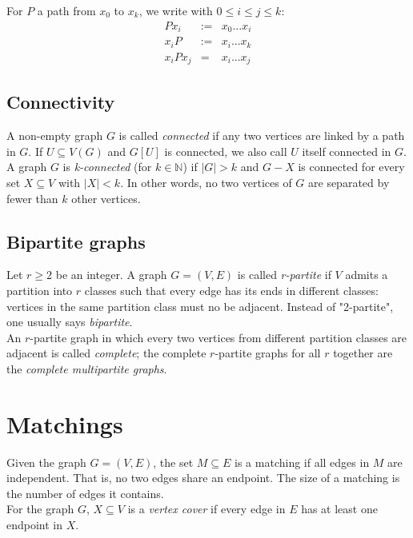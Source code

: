 \documentclass[11pt]{book}
\begin{document}
		For $P$ a path from $x_0$ to $x_k$, we write with $0 \leq i \leq j \leq k$:
		\begin{eqnarray*}
			Px_i &:=& x_0 ... x_i\\
			x_iP &:=& x_i ... x_k\\
			x_iPx_j &=& x_i ... x_j
		\end{eqnarray*}
	
	\section{Connectivity}
		A non-empty graph $G$ is called \textit{connected} if any two vertices are linked by a path in $G$. If $U \subseteq V(G)$ and $G[U]$ is connected, we also call $U$ itself connected in $G$.\\
		
		A graph $G$ is \textit{k-connected} (for $k \in \mathbb{N}$) if $|G| > k$ and $G - X$ is connected for every set $X \subseteq V$ with $|X| < k$. In other words, no two vertices of $G$ are separated by fewer than $k$ other vertices.
		
	\section{Bipartite graphs}
		Let $r \geq 2$ be an integer. A graph $G = (V, E)$ is called \textit{r-partite} if $V$ admits a partition into $r$ classes such that every edge has its ends in different classes: vertices in the same partition class must no be adjacent. Instead of "2-partite", one usually says \textit{bipartite}.\\
		
		An $r$-partite graph in which every two vertices from different partition classes are adjacent is called \textit{complete}; the complete $r$-partite graphs for all $r$ together are the \textit{complete multipartite graphs}.


\chapter{Matchings}
Given the graph $G = (V, E)$, the set $M \subseteq E$ is a matching if all edges in $M$ are independent. That is, no two edges share an endpoint. The size of a matching is the number of edges it contains.\\

For the graph $G$, $X \subseteq V$ is a \textit{vertex cover} if every edge in $E$ has at least one endpoint in $X$.\\
\end{document}
